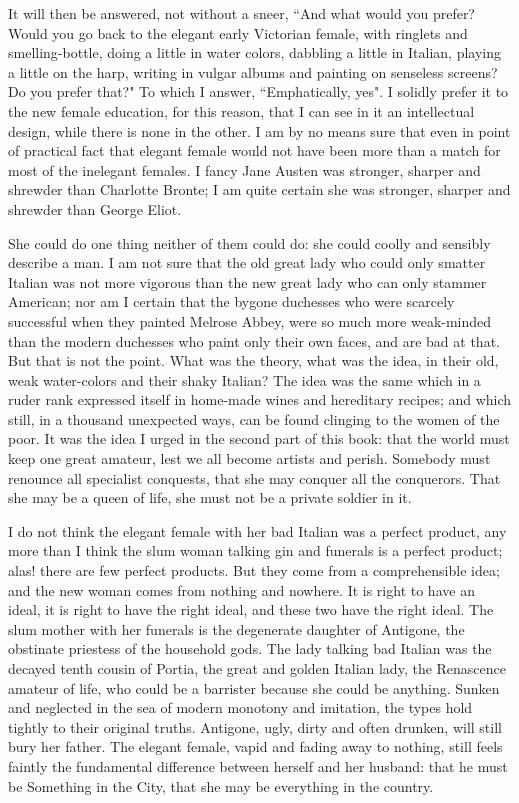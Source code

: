 \documentclass[final,10pt,letterpaper,twocolumn,openany]{book}
\begin{document}
It will then be answered, not without a sneer, ``And what would you
prefer? Would you go back to the elegant early Victorian female, with
ringlets and smelling-bottle, doing a little in water colors, dabbling a little
in Italian, playing a little on the harp, writing in vulgar albums and
painting on senseless screens? Do you prefer that?" To which I answer,
``Emphatically, yes". I solidly prefer it to the new female education, for
this reason, that I can see in it an intellectual design, while there is none in
the other. I am by no means sure that even in point of practical fact that
elegant female would not have been more than a match for most of the
inelegant females. I fancy Jane Austen was stronger, sharper and shrewder
than Charlotte Bronte; I am quite certain she was stronger, sharper and
shrewder than George Eliot. 

She could do one thing neither of them could
do: she could coolly and sensibly describe a man. I am not sure that the
old great lady who could only smatter Italian was not more vigorous than
the new great lady who can only stammer American; nor am I certain that
the bygone duchesses who were scarcely successful when they painted
Melrose Abbey, were so much more weak-minded than the modern
duchesses who paint only their own faces, and are bad at that. But that is
not the point. What was the theory, what was the idea, in their old, weak
water-colors and their shaky Italian? The idea was the same which in a
ruder rank expressed itself in home-made wines and hereditary recipes;
and which still, in a thousand unexpected ways, can be found clinging to
the women of the poor. It was the idea I urged in the second part of this
book: that the world must keep one great amateur, lest we all become
artists and perish. Somebody must renounce all specialist conquests, that
she may conquer all the conquerors. That she may be a queen of life, she
must not be a private soldier in it. 

I do not think the elegant female with
her bad Italian was a perfect product, any more than I think the slum
woman talking gin and funerals is a perfect product; alas! there are few
perfect products. But they come from a comprehensible idea; and the new
woman comes from nothing and nowhere. It is right to have an ideal, it is
right to have the right ideal, and these two have the right ideal. The slum
mother with her funerals is the degenerate daughter of Antigone, the
obstinate priestess of the household gods. The lady talking bad Italian was
the decayed tenth cousin of Portia, the great and golden Italian lady, the
Renascence amateur of life, who could be a barrister because she could be
anything. Sunken and neglected in the sea of modern monotony and
imitation, the types hold tightly to their original truths. Antigone, ugly,
dirty and often drunken, will still bury her father. The elegant female,
vapid and fading away to nothing, still feels faintly the fundamental
difference between herself and her husband: that he must be Something in
the City, that she may be everything in the country.
\end{document}
